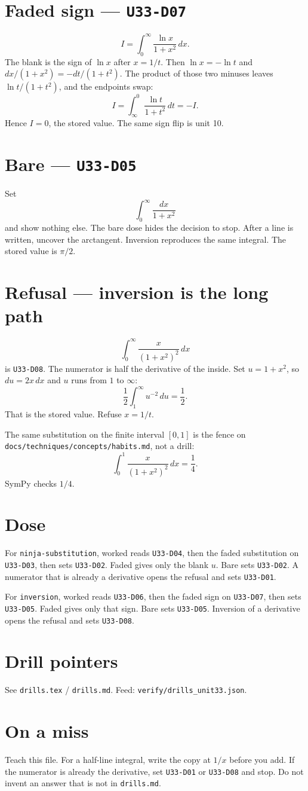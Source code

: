 \section{Faded sign --- \texttt{U33-D07}}
\[
I=\int_0^{\infty}\frac{\ln x}{1+x^2}\,dx.
\]
The blank is the sign of $\ln x$ after $x=1/t$. Then $\ln x=-\ln t$ and $dx/(1+x^2)=-dt/(1+t^2)$. The product of those two minuses leaves $\ln t/(1+t^2)$, and the endpoints swap:
\[
I=\int_{\infty}^{0}\frac{\ln t}{1+t^2}\,dt=-I.
\]
Hence $I=0$, the stored value. The same sign flip is unit 10.

\section{Bare --- \texttt{U33-D05}}
Set
\[
\int_0^{\infty}\frac{dx}{1+x^2}
\]
and show nothing else. The bare dose hides the decision to stop. After a line is written, uncover the arctangent. Inversion reproduces the same integral. The stored value is $\pi/2$.

\section{Refusal --- inversion is the long path}
\[
\int_0^{\infty}\frac{x}{(1+x^2)^2}\,dx
\]
is \texttt{U33-D08}. The numerator is half the derivative of the inside. Set $u=1+x^2$, so $du=2x\,dx$ and $u$ runs from $1$ to $\infty$:
\[
\frac12\int_1^{\infty}u^{-2}\,du=\frac12.
\]
That is the stored value. Refuse $x=1/t$.

The same substitution on the finite interval $[0,1]$ is the fence on \texttt{docs/techniques/concepts/habits.md}, not a drill:
\[
\int_0^1\frac{x}{(1+x^2)^2}\,dx=\frac14.
\]
SymPy checks $1/4$.

\section{Dose}
For \texttt{ninja-substitution}, worked reads \texttt{U33-D04}, then the faded substitution on \texttt{U33-D03}, then sets \texttt{U33-D02}. Faded gives only the blank $u$. Bare sets \texttt{U33-D02}. A numerator that is already a derivative opens the refusal and sets \texttt{U33-D01}.

For \texttt{inversion}, worked reads \texttt{U33-D06}, then the faded sign on \texttt{U33-D07}, then sets \texttt{U33-D05}. Faded gives only that sign. Bare sets \texttt{U33-D05}. Inversion of a derivative opens the refusal and sets \texttt{U33-D08}.

\section{Drill pointers}
See \texttt{drills.tex} / \texttt{drills.md}. Feed: \texttt{verify/drills\_unit33.json}.

\section*{On a miss}
Teach this file. For a half-line integral, write the copy at $1/x$ before you add. If the numerator is already the derivative, set \texttt{U33-D01} or \texttt{U33-D08} and stop. Do not invent an answer that is not in \texttt{drills.md}.


